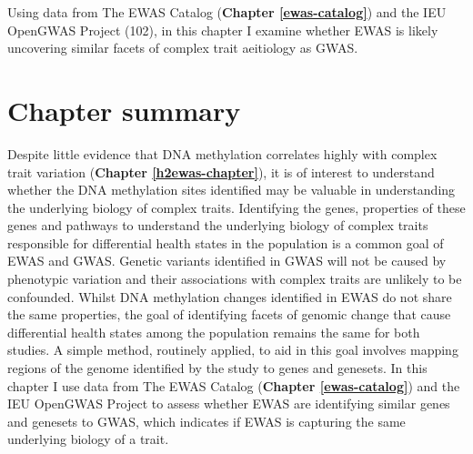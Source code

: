 \documentclass[11pt,oneside]{bristolthesis}
\begin{document}
Using data from The EWAS Catalog (\textbf{Chapter \ref{ewas-catalog}}) and the IEU OpenGWAS Project (102), in this chapter I examine whether EWAS is likely uncovering similar facets of complex trait aeitiology as GWAS.

\hypertarget{chapter-summary-06}{%
\section{Chapter summary}\label{chapter-summary-06}}

Despite little evidence that DNA methylation correlates highly with complex trait variation (\textbf{Chapter \ref{h2ewas-chapter}}), it is of interest to understand whether the DNA methylation sites identified may be valuable in understanding the underlying biology of complex traits. Identifying the genes, properties of these genes and pathways to understand the underlying biology of complex traits responsible for differential health states in the population is a common goal of EWAS and GWAS. Genetic variants identified in GWAS will not be caused by phenotypic variation and their associations with complex traits are unlikely to be confounded. Whilst DNA methylation changes identified in EWAS do not share the same properties, the goal of identifying facets of genomic change that cause differential health states among the population remains the same for both studies. A simple method, routinely applied, to aid in this goal involves mapping regions of the genome identified by the study to genes and genesets. In this chapter I use data from The EWAS Catalog (\textbf{Chapter \ref{ewas-catalog}}) and the IEU OpenGWAS Project to assess whether EWAS are identifying similar genes and genesets to GWAS, which indicates if EWAS is capturing the same underlying biology of a trait.
\end{document}
